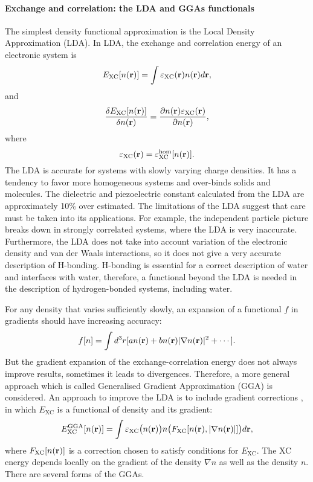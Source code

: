 \paragraph{Exchange and correlation: the LDA and GGAs functionals}
The simplest density functional approximation is the Local Density Approximation (LDA). 
In LDA, the exchange and correlation energy of an electronic system is
\begin{equation}
E_{\text{XC}}[n({\bf r})]= \int\varepsilon_{\text{XC}}({\bf r}){n({\bf r})}d{\bf r},
\label{eq:E_XC}
\end{equation}
and
\begin{equation}
\frac{\delta E_{\text{XC}}[n({\bf r})]}{\delta n({\bf r})}=\frac{\partial n({\bf r})\varepsilon_{\text{XC}}({\bf r})}{\partial n({\bf r})},
\label{eq:delta_E_XC_2}
\end{equation}
where 
\begin{equation}
\varepsilon_{\text{XC}}({\bf r})= \varepsilon^{\text{hom}}_{\text{XC}}[n({\bf r})].
\end{equation}
The LDA is accurate for systems with slowly varying charge densities. 
It has a tendency to favor more homogeneous systems and over-binds solids and molecules. 
The dielectric and piezoelectric constant calculated from the LDA are approximately 10\% over estimated. 
The limitations of the LDA suggest that care must be taken into its applications. 
For example, the independent particle picture  breaks down in strongly correlated systems, where the LDA is very inaccurate. 
Furthermore, the LDA does not take into account variation of the electronic density and van der Waals interactions\cite{Burke07}, 
so it does not give a very accurate description of H-bonding.
H-bonding is essential for a correct description of water and interfaces 
with water, therefore, a functional beyond the LDA is needed in the description of hydrogen-bonded systems, including water.

For any density that varies sufficiently slowly, an expansion of a functional $f$ in gradients should have increasing
accuracy:
\begin{equation}
f[n]= \int d^3r [a n({\bf r})+b n({\bf r})|\nabla n({\bf r})|^2 + \cdots].
\label{eq:any_f}
\end{equation}
But the gradient expansion of the exchange-correlation energy does not always improve results, sometimes it leads to divergences.
Therefore, a more general approach which is called Generalised  Gradient Approximation (GGA) is considered. An approach to improve the 
LDA is to include gradient corrections , in which $E_{\text{XC}}$ is a functional of density and its gradient:
\begin{equation}
  E^{\text{GGA}}_{\text{XC}}[n({\bf r})] = \int \varepsilon_{\text{XC}}\bigl(n({\bf r})\bigr)n\bigl(F_{\text{XC}}[ n({\bf r}), |\nabla n({\bf r})| ]\bigr)d{\bf{r}},
\end{equation}
where $F_{\text{XC}}[n({\bf r})]$ is a correction chosen to satisfy conditions for $E_{\text{XC}}$. The XC energy depends locally on the
gradient of the density $\nabla n$ as well as the density $n$. There are several forms of the GGAs. 

